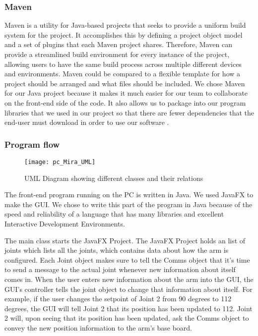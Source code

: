 \subsubsection{Maven}
Maven is a utility for Java-based projects that seeks to provide a uniform build system for the project. It accomplishes this by defining a project object model and a set of plugins that each Maven project shares. Therefore, Maven can provide a streamlined build environment for every instance of the project, allowing users to have the same build process across multiple different devices and environments. Maven could be compared to a flexible template for how a project should be arranged and what files should be included. We chose Maven for our Java project because it makes it much easier for our team to collaborate on the front-end side of the code.  It also allows us to package into our program libraries that we used in our project so that there are fewer dependencies that the end-user must download in order to use our software \cite{maven}.


\subsubsection{Program flow}

\begin{figure}[H]
\centering
\texttt{[image: pc\_Mira\_UML]}
\caption{UML Diagram showing different classes and their relations}
\label{fig:Functional_Block_Diagram}
\end{figure}

\noindent The front-end program running on the PC is written in Java. We used JavaFX to make the GUI. We chose to write this part of the program in Java because of the speed and reliability of a language that has many libraries and excellent Interactive Development Environments.  

\noindent The main class starts the JavaFX Project. The JavaFX Project holds an list of joints which lists all the joints, which contains data about how the arm is configured. Each Joint object makes sure to tell the Comms object that it's time to send a message to the actual joint whenever new information about itself comes in. When the user enters new information about the arm into the GUI, the GUI's controller tells the joint object to change that information about itself. For example, if the user changes the setpoint of Joint 2 from 90 degrees to 112 degrees, the GUI will tell Joint 2 that its position has been updated to 112. Joint 2 will, upon seeing that its position has been updated, ask the Comms object to convey the new position information to the arm's base board.

